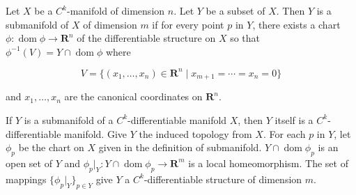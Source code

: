 Let $X$ be a $C^k$-manifold of dimension $n$. Let $Y$ be a subset of $X$. Then $Y$ is a submanifold of $X$ of dimension $m$ if for every point $p$ in $Y$, there exists a chart $\phi: \operatorname{dom}\phi \to \mathbf{R}^n$ of the differentiable structure on $X$ so that $\phi^{-1}(V) = Y \cap \operatorname{dom}\phi$ where

$$V = \{(x_1, \ldots, x_n) \in \mathbf{R}^n \mid x_{m+1} = \cdots = x_n = 0\}$$

and $x_1, \ldots, x_n$ are the canonical coordinates on $\mathbf{R}^n$.

If $Y$ is a submanifold of a $C^k$-differentiable manifold $X$, then $Y$ itself is a $C^k$-differentiable manifold. Give $Y$ the induced topology from $X$. For each $p$ in $Y$, let $\phi_p$ be the chart on $X$ given in the definition of submanifold. $Y \cap \operatorname{dom}\phi_p$ is an open set of $Y$ and $\phi_p|_Y: Y \cap \operatorname{dom}\phi_p \to \mathbf{R}^m$ is a local homeomorphism. The set of mappings $\{\phi_p|_Y\}_{p \in Y}$ give $Y$ a $C^k$-differentiable structure of dimension $m$.

